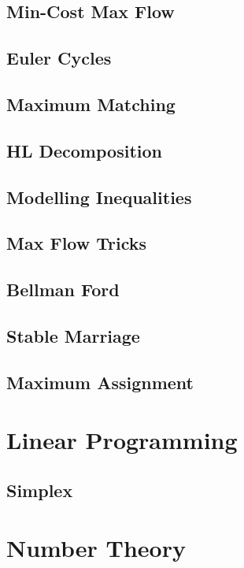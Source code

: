 		\subsection{Min-Cost Max Flow}
			
		\subsection{Euler Cycles}
			
		\subsection{Maximum Matching}
			
		\subsection{HL Decomposition}
			
		\subsection{Modelling Inequalities}
			
		\subsection{Max Flow Tricks}
			
		\subsection{Bellman Ford}
			
		\subsection{Stable Marriage}
			
		\subsection{Maximum Assignment}
			
	\section{Linear Programming}
		\subsection{Simplex}
			
	\section{Number Theory}
